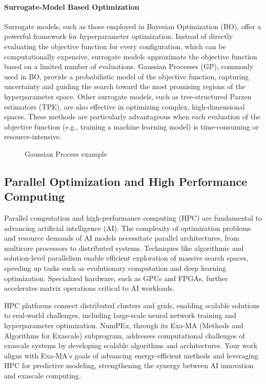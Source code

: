 \paragraph{Surrogate-Model Based Optimization}  
Surrogate models, such as those employed in Bayesian Optimization (BO), offer a powerful framework for hyperparameter optimization. Instead of directly evaluating the objective function for every configuration, which can be computationally expensive, surrogate models approximate the objective function based on a limited number of evaluations. Gaussian Processes (GP), commonly used in BO, provide a probabilistic model of the objective function, capturing uncertainty and guiding the search toward the most promising regions of the hyperparameter space. Other surrogate models, such as tree-structured Parzen estimators (TPE), are also effective in optimizing complex, high-dimensional spaces. These methods are particularly advantageous when each evaluation of the objective function (e.g., training a machine learning model) is time-consuming or resource-intensive.
\begin{figure}[h]
    \centering
    \caption{Gaussian Process example}
    \label{fig:gp_eg}
\end{figure}




\subsection{Parallel Optimization and High Performance Computing}

Parallel computation and high-performance computing (HPC) are fundamental to advancing artificial intelligence (AI). The complexity of optimization problems and resource demands of AI models necessitate parallel architectures, from multicore processors to distributed systems. Techniques like algorithmic and solution-level parallelism enable efficient exploration of massive search spaces, speeding up tasks such as evolutionary computation and deep learning optimization. Specialized hardware, such as GPUs and FPGAs, further accelerates matrix operations critical to AI workloads.

HPC platforms connect distributed clusters and grids, enabling scalable solutions to real-world challenges, including large-scale neural network training and hyperparameter optimization. NumPEx, through its Exa-MA (Methods and Algorithms for Exascale) subprogram, addresses computational challenges of exascale systems by developing scalable algorithms and architectures. Your work aligns with Exa-MA’s goals of advancing energy-efficient methods and leveraging HPC for predictive modeling, strengthening the synergy between AI innovation and exascale computing.


